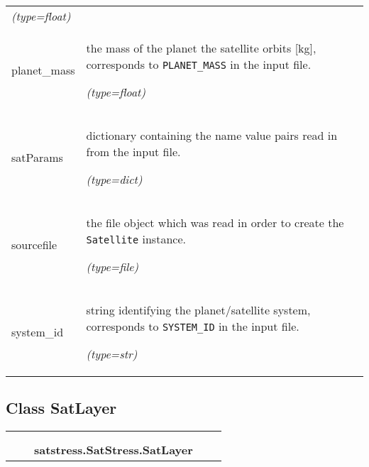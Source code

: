 \begin{longtable}{|p{\varnamewidth}|p{\vardescrwidth}|l}
            {\it (type=float)}&\\
\cline{1-2}
\raggedright p\-l\-a\-n\-e\-t\-\_\-m\-a\-s\-s\- & \raggedright the mass of the planet the satellite orbits [kg], corresponds to 
          \texttt{PLANET\_MASS} in the input file.

            {\it (type=float)}&\\
\cline{1-2}
\raggedright s\-a\-t\-P\-a\-r\-a\-m\-s\- & \raggedright dictionary containing the name value pairs read in from the input
          file.

            {\it (type=dict)}&\\
\cline{1-2}
\raggedright s\-o\-u\-r\-c\-e\-f\-i\-l\-e\- & \raggedright the file object which was read in order to create the 
          \texttt{Satellite} instance.

            {\it (type=file)}&\\
\cline{1-2}
\raggedright s\-y\-s\-t\-e\-m\-\_\-i\-d\- & \raggedright string identifying the planet/satellite system, corresponds to 
          \texttt{SYSTEM\_ID} in the input file.

            {\it (type=str)}&\\
\cline{1-2}
\end{longtable}



\subsection{Class SatLayer}

    \label{satstress:SatStress:SatLayer}
\begin{tabular}{cccccc}
\multicolumn{2}{r}{\settowidth{\BCL}{object}\multirow{2}{\BCL}{object}}
&&
  \\\cline{3-3}
  &&\multicolumn{1}{c|}{}
&&
  \\
&&\multicolumn{2}{l}{\textbf{satstress.SatStress.SatLayer}}
\end{tabular}

